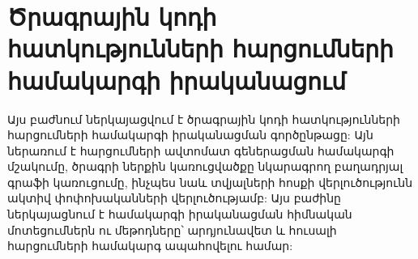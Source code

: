 {
	\clearpage
	\section{Ծրագրային կոդի հատկությունների հարցումների համակարգի իրականացում}\label{sec:queryEngineImplementation}
	Այս բաժնում ներկայացվում է ծրագրային կոդի հատկությունների հարցումների համակարգի իրականացման գործընթացը:
	Այն ներառում է հարցումների ավտոմատ գեներացման համակարգի մշակումը, ծրագրի ներքին կառուցվածքը նկարագրող բաղադրյալ
	գրաֆի կառուցումը, ինչպես նաև տվյալների հոսքի վերլուծությունն ակտիվ փոփոխականների վերլուծությամբ: Այս
	բաժինը ներկայացնում է համակարգի իրականացման հիմնական մոտեցումներն ու մեթոդները՝ արդյունավետ
	և հուսալի հարցումների համակարգ ապահովելու համար:

	

	
}

